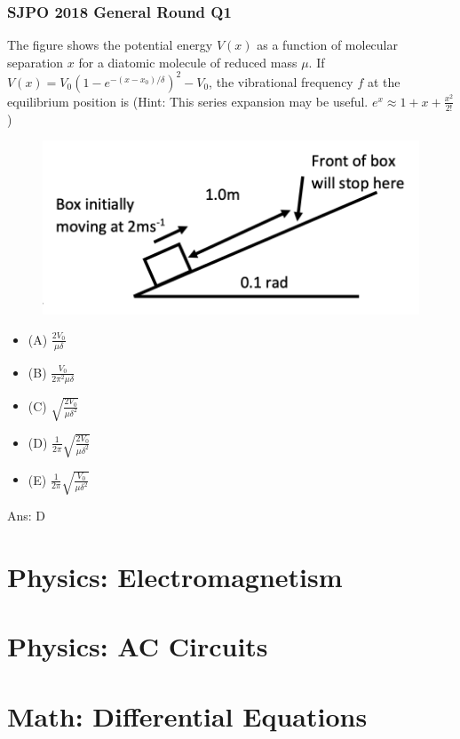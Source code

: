 \documentclass{article}
\begin{document}
\subsubsection{SJPO 2018 General Round Q1}
The figure shows the potential energy $V(x)$ as a function of molecular separation $x$ for a diatomic molecule of reduced mass $\mu$.
If $V(x)=V_0\left(1-e^{-\left(x-x_0\right)/\delta}\right)^2-V_0$, the vibrational frequency $f$ at the equilibrium position is
(Hint: This series expansion may be useful. $e^x \approx 1+x+\frac{x^2}{2 !}$ ) \\
\begin{figure}
\includegraphics[width=1.0\linewidth]{images/sjpo2016q4.png}
\end{figure}
\begin{itemize}
\item[] (A) $\frac{2 V_0}{\mu \delta}$
\item[] (B) $\frac{V_0}{2 \pi^2 \mu \delta}$
\item[] (C) $\sqrt{\frac{2 V_0}{\mu \delta^2}}$
\item[] (D) $\frac{1}{2 \pi} \sqrt{\frac{2 V_0}{\mu \delta^2}}$
\item[] (E) $\frac{1}{2 \pi} \sqrt{\frac{V_0}{\mu \delta^2}}$
\end{itemize}
Ans: \ifpaper D \fi
\clearpage
\section{Physics: Electromagnetism}
\section{Physics: AC Circuits}

\section{Math: Differential Equations}
\end{document}
